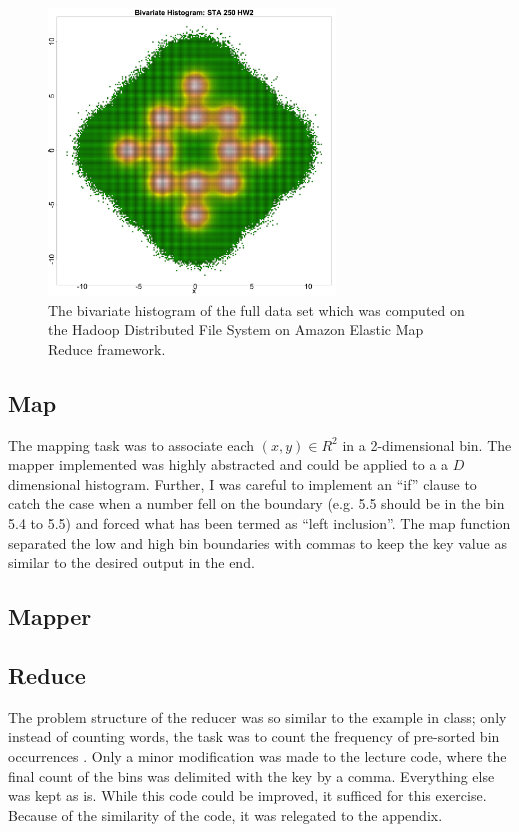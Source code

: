 \documentclass[10pt]{amsart}
\newcommand{\prettycode}[2]{
  \hrulefill
  \subsection*{#1}
  
  \vspace{2em}
}
\begin{document}
\begin{figure}[htbp] %
   \centering
   \includegraphics[width=3in]{../Streaming/hist2d.png} 
   \caption{The bivariate histogram of the full data set which was computed on the Hadoop Distributed File System on Amazon Elastic Map Reduce framework. }
   \label{fig:hist2d}
\end{figure}

\subsection{Map}

The mapping task was to associate each $(x,y) \in R^2$ in a 2-dimensional bin. The mapper implemented was highly abstracted and could be applied to a a $D$ dimensional histogram.  Further, I was careful to implement an ``if'' clause to catch the case when a number fell on the boundary (e.g. 5.5 should be in the bin 5.4 to 5.5) and forced what has been termed as ``left inclusion''. The map function separated the low and high bin boundaries with commas to keep the key value as similar to the desired output in the end.

\prettycode{Mapper}{../Streaming/mapper.py}

\subsection{Reduce}

The problem structure of the reducer was so similar to the example in class; only instead of counting words, the task was to count the frequency of pre-sorted bin occurrences . Only a minor modification was made to the lecture code, where the final count of the bins was delimited with the key by a comma. Everything else was kept as is. While this code could be improved, it sufficed for this exercise. Because of the similarity of the code, it was relegated to the appendix.
\end{document}
